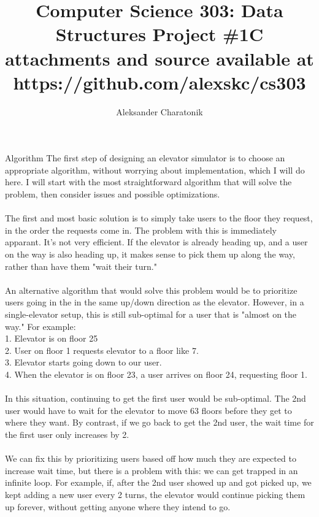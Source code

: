 \documentclass[10pt]{article}
\title {Computer Science 303: Data Structures Project \#1C\\
\large attachments and source available at https://github.com/alexskc/cs303}
\author{Aleksander Charatonik}
\begin{document}
\maketitle
\begin{section}{Algorithm}
The first step of designing an elevator simulator is to choose an appropriate algorithm, without worrying about implementation, which I will do here. I will start with the most straightforward algorithm that will solve the problem, then consider issues and possible optimizations.\\
\\
The first and most basic solution is to simply take users to the floor they request, in the order the requests come in. The problem with this is immediately apparant. It's not very efficient. If the elevator is already heading up, and a user on the way is also heading up, it makes sense to pick them up along the way, rather than have them "wait their turn."\\
\\
An alternative algorithm that would solve this problem would be to prioritize users going in the in the same up/down direction as the elevator. However, in a single-elevator setup, this is still sub-optimal for a user that is "almost on the way." For example:\\
1. Elevator is on floor 25\\
2. User on floor 1 requests elevator to a floor like 7.\\
3. Elevator starts going down to our user.\\
4. When the elevator is on floor 23, a user arrives on floor 24, requesting floor 1.\\
\\
In this situation, continuing to get the first user would be sub-optimal. The 2nd user would have to wait for the elevator to move 63 floors before they get to where they want. By contrast, if we go back to get the 2nd user, the wait time for the first user only increases by 2.\\
\\
We can fix this by prioritizing users based off how much they are expected to increase wait time, but there is a problem with this: we can get trapped in an infinite loop. For example, if, after the 2nd user showed up and got picked up, we kept adding a new user every 2 turns, the elevator would continue picking them up forever, without getting anyone where they intend to go.\\
\\

\end{section}
\end{document}
